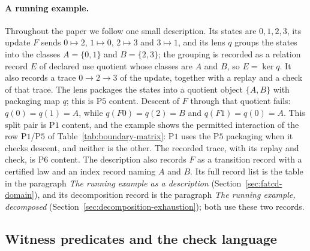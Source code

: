 \documentclass[11pt]{article}
\theoremstyle{definition}
\newcommand{\Pone}{\ensuremath{\mathrm{P1}}}
\newcommand{\Pfive}{\ensuremath{\mathrm{P5}}}
\newcommand{\Psix}{\ensuremath{\mathrm{P6}}}
\begin{document}
\paragraph{A running example.} Throughout the paper we follow one small
description. Its states are \(0,1,2,3\), its update \(F\) sends
\(0\mapsto2\), \(1\mapsto0\), \(2\mapsto3\) and \(3\mapsto1\), and its lens
\(q\) groups the states into the classes \(A=\{0,1\}\) and \(B=\{2,3\}\); the
grouping is recorded as a relation record \(E\) of declared use quotient whose
classes are \(A\) and \(B\), so \(E=\ker q\). It
also records a trace \(0\to2\to3\) of the update, together with a replay and a
check of that trace. The lens packages the states into a quotient object
\(\{A,B\}\) with packaging map \(q\); this is \Pfive{} content. Descent of
\(F\) through that quotient fails: \(q(0)=q(1)=A\), while \(q(F0)=q(2)=B\) and
\(q(F1)=q(0)=A\). This split pair is \Pone{} content, and the example shows the
permitted interaction of the row \Pone{}/\Pfive{} of
Table~\ref{tab:boundary-matrix}: \Pone{} uses the \Pfive{} packaging when it
checks descent, and neither is the other. The recorded trace, with its replay
and check, is \Psix{} content. The description also records \(F\) as a
transition record with a certified law and an index record naming \(A\) and
\(B\). Its full record list is the table in the paragraph \emph{The running example as a description} (Section~\ref{sec:fatcd-domain}), and its decomposition record is the paragraph \emph{The running example, decomposed} (Section~\ref{sec:decomposition-exhaustion}); both use these two records.

\subsection*{Witness predicates and the check language}\label{subsec:witness-predicates}
\end{document}
